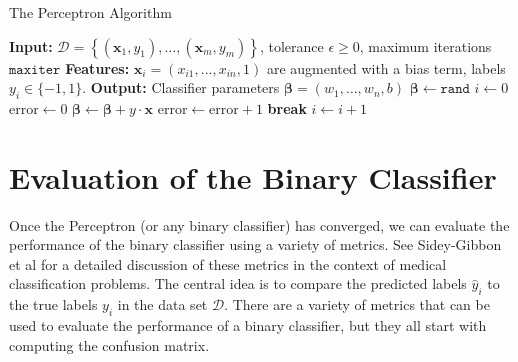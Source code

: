 \documentclass{article}[12pt]
\begin{document}
\begin{algorithm}[H]
    \caption{The Perceptron Algorithm}\label{alg:perceptron}
    \begin{algorithmic}[1]
        \State \textbf{Input:} $\mathcal{D} = \left\{(\mathbf{x}_{1},y_{1}),\dotsc,(\mathbf{x}_{m},y_{m})\right\}$, tolerance $\epsilon\geq{0}$, maximum iterations $\texttt{maxiter}$
        \State \textbf{Features:} $\mathbf{x}_{i} = \left(x_{i1},\dots, x_{in},1\right)$ are augmented with a bias term, labels $y_{i}\in\{-1,1\}$.
        \State \textbf{Output:} Classifier parameters $\mathbf{\beta} = \left(w_{1},\dots, w_{n}, b\right)$
        \State $\mathbf{\beta} \gets \texttt{rand}$
        \State $i \gets 0$
        \State $\text{error} \gets 0$
                \State $\mathbf{\beta} \gets \mathbf{\beta} + {y}\cdot\mathbf{x}$
                \State $\text{error} \gets \text{error} + 1$
            \EndIf
        \EndFor
            \State \textbf{break}     
        \EndIf
        \State $i \gets i + 1$
        \EndWhile
    \end{algorithmic}
\end{algorithm}

\section{Evaluation of the Binary Classifier}
Once the Perceptron (or any binary classifier) has converged, we can evaluate the performance of the binary classifier using a variety of metrics.
See Sidey-Gibbon et al \cite{SG2019} for a detailed discussion of these metrics in the context of medical classification problems.
The central idea is to compare the predicted labels $\hat{y}_{i}$ to the true labels $y_{i}$ in the data set $\mathcal{D}$. 
There are a variety of metrics that can be used to evaluate the performance of a binary classifier, but they all start with computing the confusion matrix.
\end{document}
